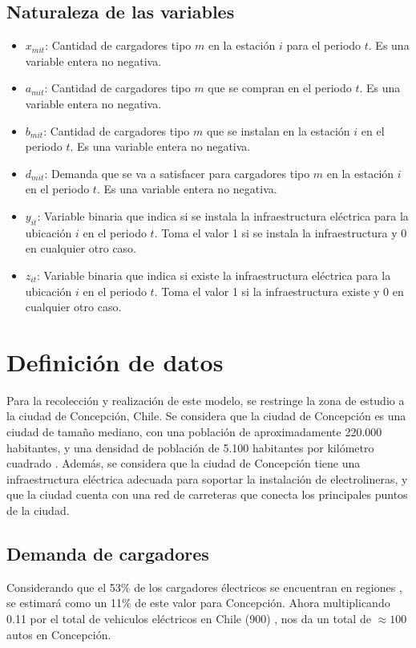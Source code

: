 \documentclass[letterpaper]{article}
\begin{document}
\begin{flushleft}
	\subsection{Naturaleza de las variables}
	\begin{itemize}
		\item $x_{mit}$: Cantidad de cargadores tipo $m$ en la estación $i$ para el periodo $t$. Es una variable entera no negativa.
		\item $a_{mit}$: Cantidad de cargadores tipo $m$ que se compran en el periodo $t$. Es una variable entera no negativa.
		\item $b_{mit}$: Cantidad de cargadores tipo $m$ que se instalan en la estación $i$ en el periodo $t$. Es una variable entera no negativa.
		\item $d_{mit}$: Demanda que se va a satisfacer para cargadores tipo $m$ en la estación $i$ en el periodo $t$. Es una variable entera no negativa.
		\item $y_{it}$: Variable binaria que indica si se instala la infraestructura eléctrica para la ubicación $i$ en el periodo $t$. Toma el valor 1 si se instala la infraestructura y 0 en cualquier otro caso.
		\item $z_{it}$: Variable binaria que indica si existe la infraestructura eléctrica para la ubicación $i$ en el periodo $t$. Toma el valor 1 si la infraestructura existe y 0 en cualquier otro caso.
	\end{itemize}
	\section{Definición de datos}
	
	Para la recolección y realización de este modelo, se restringe la zona de estudio a la ciudad de Concepción, Chile. Se considera que la ciudad de Concepción es una ciudad de tamaño mediano, con una población de aproximadamente 220.000 habitantes, y una densidad de población de 5.100 habitantes por kilómetro cuadrado \cite {INE}. Además, se considera que la ciudad de Concepción tiene una infraestructura eléctrica adecuada para soportar la instalación de electrolineras, y que la ciudad cuenta con una red de carreteras que conecta los principales puntos de la ciudad.

	\subsection{Demanda de cargadores}

	Considerando que el 53\% de los cargadores électricos se encuentran en regiones \cite{cargadores}, se estimará como un 11\% de este valor para Concepción. Ahora multiplicando 0.11 por el total de vehiculos eléctricos en Chile (900) \cite{autostot}, nos da un total de $\approx 100$ autos en Concepción. 
	

\end{flushleft}
\end{document}
